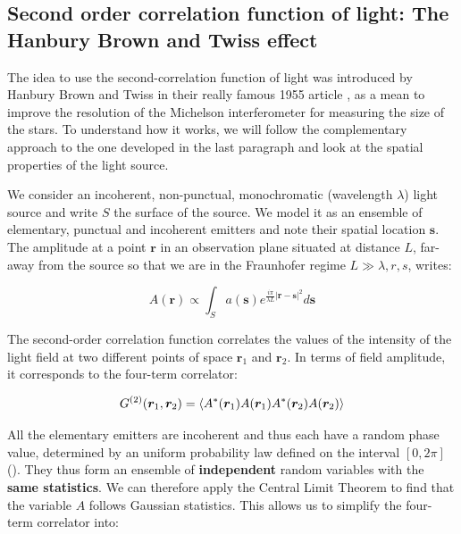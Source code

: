 


\subsection{Second order correlation function of light: The Hanbury Brown and Twiss effect}

The idea to use the second-correlation function of light was introduced by Hanbury Brown and Twiss in their really famous 1955 article \cite{brown1954lxxiv}, as a mean to improve the resolution of the Michelson interferometer for measuring the size of the stars. To understand how it works, we will follow the complementary approach to the one developed in the last paragraph and look at the spatial properties of the light source. 

We consider an incoherent, non-punctual, monochromatic (wavelength $\lambda$) light source and write $S$ the surface of the source. We model it as an ensemble of elementary, punctual and incoherent emitters and note their spatial location $\bm{s}$. The amplitude at a point $\bm{r}$ in an observation plane situated at distance $L$, far-away from the source so that we are in the Fraunhofer regime $L \gg \lambda, r,s$, writes:

\begin{equation}
    A(\bm{r}) \propto \int_{S} a(\bm{s}) e^{\frac{i \pi}{\lambda L}|\bm{r}-\bm{s}|^{2}} d \bm{s}
    \label{eq:amp_HBT}
\end{equation}

The second-order correlation function correlates the values of the intensity of the light field at two different points of space $\bm{r}_1$ and $\bm{r}_2$. In terms of field amplitude, it corresponds to the four-term correlator:

\begin{equation}
    G^{(2)} (\bm{r}_1,\bm{r}_2) = \left\langle A^*(\bm{r}_1) A(\bm{r}_1) A^*(\bm{r}_2) A(\bm{r}_2)\right\rangle
\end{equation}

All the elementary emitters are incoherent and thus each have a random phase value, determined by an uniform probability law defined on the interval $[0,2\pi]$ (). They thus form an ensemble of \textbf{independent} random variables with the \textbf{same statistics}. We can therefore apply the Central Limit Theorem to find that the variable $A$ follows Gaussian statistics. This allows us to simplify the four-term correlator into:

